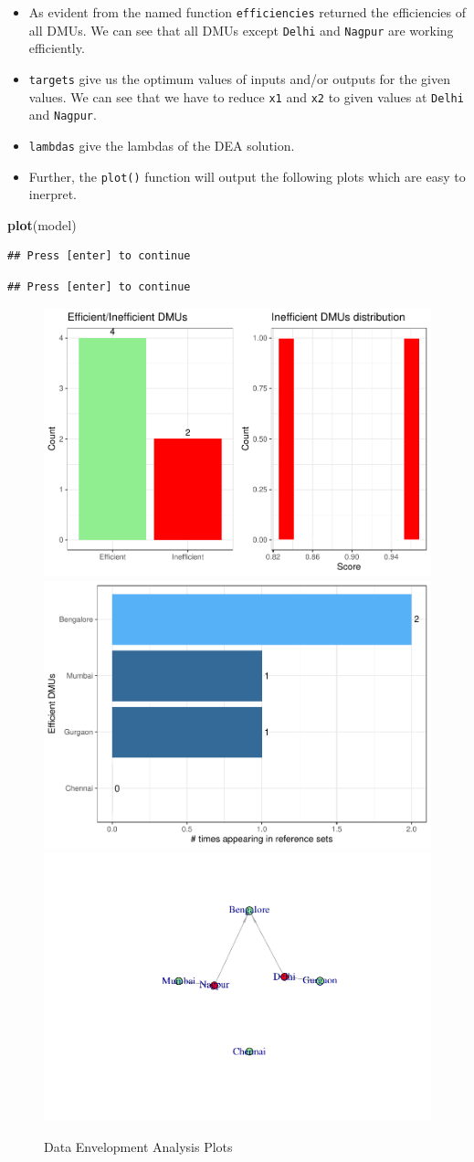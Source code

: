 \documentclass[
]{book}
\newenvironment{Shaded}{\begin{snugshade}}{\end{snugshade}}
\newcommand{\FunctionTok}[1]{\textcolor[rgb]{0.13,0.29,0.53}{\textbf{#1}}}
\newcommand{\NormalTok}[1]{#1}
\providecommand{\tightlist}{%
  \setlength{\itemsep}{0pt}\setlength{\parskip}{0pt}}
\begin{document}
\begin{itemize}
\tightlist
\item
  As evident from the named function \texttt{efficiencies} returned the efficiencies of all DMUs. We can see that all DMUs except \texttt{Delhi} and \texttt{Nagpur} are working efficiently.
\item
  \texttt{targets} give us the optimum values of inputs and/or outputs for the given values. We can see that we have to reduce \texttt{x1} and \texttt{x2} to given values at \texttt{Delhi} and \texttt{Nagpur}.
\item
  \texttt{lambdas} give the lambdas of the DEA solution.
\item
  Further, the \texttt{plot()} function will output the following plots which are easy to inerpret.
\end{itemize}

\begin{Shaded}
\begin{Highlighting}[]
\FunctionTok{plot}\NormalTok{(model)}
\end{Highlighting}
\end{Shaded}

\begin{verbatim}
## Press [enter] to continue
\end{verbatim}

\begin{verbatim}
## Press [enter] to continue
\end{verbatim}

\begin{figure}

{\centering \includegraphics[width=0.3\linewidth]{DauR_files/figure-latex/deaplots-1} \includegraphics[width=0.3\linewidth]{DauR_files/figure-latex/deaplots-2} \includegraphics[width=0.3\linewidth]{DauR_files/figure-latex/deaplots-3} 

}

\caption{Data Envelopment Analysis Plots}\label{fig:deaplots}
\end{figure}
\end{document}

